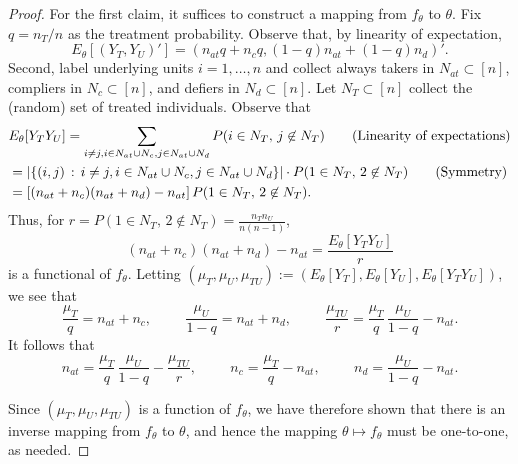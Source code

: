 \documentclass[12pt,reqno]{amsart}
\theoremstyle{theorem}
\theoremstyle{definition}
\newcommand{\0}{\mathbf{0}}
\newcommand{\1}{\mathbf{1}}
\begin{document}
\propid*
\begin{proof}
For the first claim, it suffices to construct a mapping from $f_\theta$ to $\theta$. 
Fix $q = n_T/n$ as the treatment probability. 
    Observe that, by linearity of expectation, \[
        E_{\theta}[(Y_T, Y_U)'] = (n_{at} q + n_c q, (1-q) n_{at} + (1-q) n_d)'. 
    \]
    Second, label underlying units $i=1,\ldots,n$ and collect always takers in $N_{at}
    \subset [n]$, compliers in $N_c \subset [n]$, and defiers in $N_d \subset [n]$. Let
    $N_T \subset [n]$ collect the (random) set of treated individuals. 
    Observe that \begin{align*}
    &E_{\theta}[Y_TY_U] = \sum_{i \neq j, i\in N_{at} \cup N_c, j \in N_{at} \cup N_d} P
    (\text{$i \in N_T$, $j \not \in N_T$}) \tag{Linearity of expectations} \\
    &= |\{(i,j) \,:\, i \neq j, i\in N_{at} \cup N_c, j \in N_{at} \cup N_d \} | \cdot P
    (\text{$1 \in N_T$, $2 \not \in N_T$}) \tag{Symmetry}\\
    &= \left[{(n_{at} + n_c) (n_{at} + n_d) - n_{at}}\right] P
    (\text{$1 \in N_T$, $2 \not \in N_T$}).
    \end{align*}
    Thus,
    for $r = P
    (\text{$1 \in N_T$, $2 \not \in N_T$}) = \tfrac{n_T n_U}{n (n-1)}$,
    \[
        (n_{at} + n_c)(n_{at} + n_d) - n_{at} = \frac{E_{\theta}[Y_T Y_U]}{r} 
    \]
    is a functional of $f_\theta$. Letting $(\mu_T,\mu_U, \mu_{TU}) := (E_\theta[ Y_T] , E_\theta[Y_U], E_\theta[Y_T Y_U])$, we see that 
\begin{equation*}
    \frac{\mu_T}{q} = n_{at} + n_c, \hspace{1cm} \frac{\mu_U}{1-q} = n_{at} + n_d, \hspace{1cm} \frac{\mu_{TU}}{r} = \frac{\mu_T}{q}\,\frac{\mu_U}{1-q} - n_{at}.
\end{equation*}
It follows that
\begin{equation*}
    n_{at} = \frac{\mu_T}{q}\,\frac{\mu_U}{1-q} - \frac{\mu_{TU}}{r},  \hspace{1cm } n_c = \frac{\mu_T}{q} - n_{at}, \hspace{1cm} n_d = \frac{\mu_U}{1-q} - n_{at}.
\end{equation*}

\noindent Since $(\mu_T,\mu_U, \mu_{TU})$ is a function of $f_\theta$, we have therefore shown that there is an inverse mapping from $f_\theta$ to $\theta$, and hence the mapping $\theta \mapsto f_{\theta}$ must be one-to-one, as needed. 


\end{proof}
\end{document}
